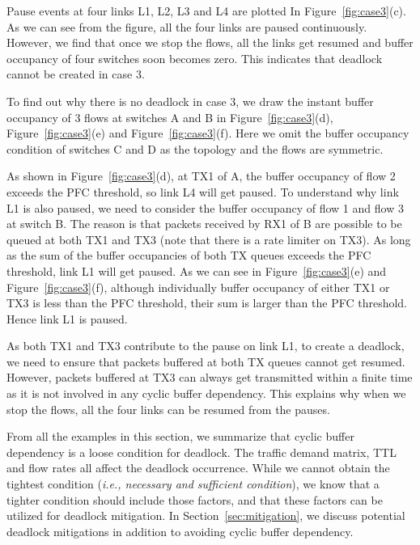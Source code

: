 Pause events at four links L1, L2, L3 and L4 are plotted In Figure~\ref{fig:case3}(c).  As we can see 
from the figure, all the four links are paused continuously. However, we find that once we stop the 
flows, all the links get resumed and buffer occupancy of four switches soon becomes zero. This 
indicates that deadlock cannot be created in case 3.

To find out why there is no deadlock in case 3, we draw the instant buffer occupancy of 3 flows at 
switches A and B in Figure~\ref{fig:case3}(d), Figure~\ref{fig:case3}(e) and Figure~\ref{fig:case3}(f). 
Here we omit the buffer occupancy condition of switches C and D as the topology and the flows are symmetric.

As shown in Figure~\ref{fig:case3}(d), at TX1 of A, the buffer occupancy of flow 2 exceeds the PFC 
threshold, so link L4 will get paused. To understand why link L1 is also paused, we need to consider 
the buffer occupancy of flow 1 and flow 3 at switch B. The reason is that packets received by RX1 of 
B are possible to be queued at both TX1 and TX3 (note that there is a rate limiter on TX3). As long 
as the sum of the buffer occupancies of both TX queues exceeds the PFC threshold, link L1 will get paused. 
As we can see in Figure~\ref{fig:case3}(e) and Figure~\ref{fig:case3}(f), although individually buffer 
occupancy of either TX1 or TX3 is less than the PFC threshold, their sum is larger than the PFC 
threshold. Hence link L1 is paused.

As both TX1 and TX3 contribute to the pause on link L1, to create a deadlock, we need to ensure that 
packets buffered at both TX queues cannot get resumed. However, packets buffered at TX3 can always get 
transmitted within a finite time as it is not involved in any cyclic buffer dependency. This explains 
why when we stop the flows, all the four links can be resumed from the pauses. 
\fi


 From all the examples in this section, we summarize that cyclic buffer dependency is
 a loose condition for deadlock. The traffic demand matrix, TTL and flow rates all affect the deadlock
 occurrence. While we cannot obtain the tightest condition ({\em i.e., necessary and sufficient condition}), 
we know that a tighter condition should include those factors, and that these factors can be utilized
for deadlock mitigation. In Section~\ref{sec:mitigation}, we discuss potential deadlock mitigations in 
addition to avoiding cyclic buffer dependency.

